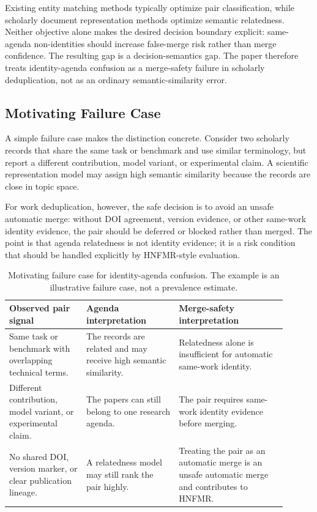 \documentclass[preprint,12pt]{elsarticle}
\begin{document}
Existing entity matching methods \citep{fellegi1969record,mudgal2018deep,li2020ditto} typically optimize pair classification, while scholarly document representation methods optimize semantic relatedness. Neither objective alone makes the desired decision boundary explicit: same-agenda non-identities should increase false-merge risk rather than merge confidence. The resulting gap is a decision-semantics gap. The paper therefore treats identity-agenda confusion as a merge-safety failure in scholarly deduplication, not as an ordinary semantic-similarity error.

\subsection{Motivating Failure Case}

A simple failure case makes the distinction concrete. Consider two scholarly records that share the same task or benchmark and use similar terminology, but report a different contribution, model variant, or experimental claim. A scientific representation model may assign high semantic similarity because the records are close in topic space.

For work deduplication, however, the safe decision is to avoid an unsafe automatic merge: without DOI agreement, version evidence, or other same-work identity evidence, the pair should be deferred or blocked rather than merged. The point is that agenda relatedness is not identity evidence; it is a risk condition that should be handled explicitly by HNFMR-style evaluation.

\begin{table}[H]
\caption{Motivating failure case for identity-agenda confusion. The example is an illustrative failure case, not a prevalence estimate.}
\label{tab:motivating-failure-case}
\centering
\footnotesize
\setlength{\tabcolsep}{3pt}
\begin{tabular}{L{0.25\linewidth}L{0.30\linewidth}L{0.35\linewidth}}
\toprule
Observed pair signal & Agenda interpretation & Merge-safety interpretation \\
\midrule
Same task or benchmark with overlapping technical terms. & The records are related and may receive high semantic similarity. & Relatedness alone is insufficient for automatic same-work identity. \\
Different contribution, model variant, or experimental claim. & The papers can still belong to one research agenda. & The pair requires same-work identity evidence before merging. \\
No shared DOI, version marker, or clear publication lineage. & A relatedness model may still rank the pair highly. & Treating the pair as an automatic merge is an unsafe automatic merge and contributes to HNFMR. \\
\bottomrule
\end{tabular}
\end{table}
\end{document}
